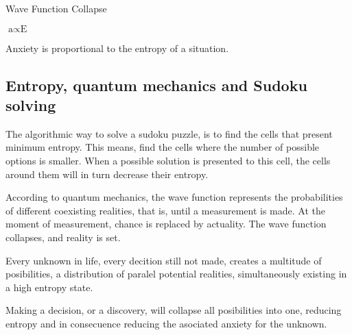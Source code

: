 
\begin{center}
\vspace*{\fill}
\Huge Wave Function Collapse

\vspace{2cm}

\begin{flushright}
\large
\textit{ $\text{a} \propto \text{E}$ }
\end{flushright}
\vspace*{\fill}
\end{center}

\normalsize


Anxiety is proportional to the entropy of a situation. 


\subsection*{ Entropy, quantum mechanics and Sudoku solving} 

The algorithmic way to solve a sudoku puzzle, is to find the cells 
that present minimum entropy. 
This means, find the cells where the number of possible options is smaller.
When a possible solution is presented to this cell, the cells around them will 
in turn decrease their entropy. 

According to quantum mechanics, the wave function represents the probabilities 
of different coexisting realities, that is, until a 
measurement is made. At the moment of measurement, chance is replaced by 
actuality. The wave function collapses, and reality is set.

Every unknown in life, every decition still not made, creates a multitude of 
posibilities, a distribution of paralel potential realities, simultaneously 
existing in a high entropy state. 

Making a decision, or a discovery, will collapse all posibilities into one, 
reducing entropy and in consecuence reducing the asociated anxiety for the unknown. 







